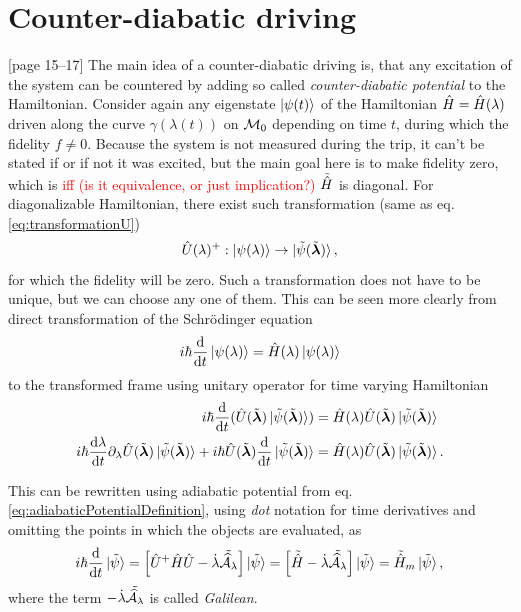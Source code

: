 \section{Counter-diabatic driving}
\citep{kolodrubez}[page 15--17] The main idea of a counter-diabatic driving is, that any excitation of the system can be countered by adding so called \emph{counter-diabatic potential} to the Hamiltonian. Consider again any eigenstate $\kpsit$ of the Hamiltonian $\HH=\HH(\lambda)$ driven along the curve $\gamma(\lambda(t))$ on $\M_0$ depending on time $t$, during which the fidelity $f\neq 0$. Because the system is not measured during the trip, it can't be stated if or if not it was excited, but the main goal here is to make fidelity zero, which is \textcolor{red}{iff (is it equivalence, or just implication?)} $\tilde\HH$ is diagonal. For diagonalizable Hamiltonian, there exist such transformation (same as eq. \ref{eq:transformationU})
\begin{equation}
    \U(\lambda)^+:  \ket{\psi(\lambda)} \rightarrow \ket{\tilde\psi(\tilde\llambda)},
    \label{eq:transformationUtimeDependentH}
\end{equation}
for which the fidelity will be zero. Such a transformation does not have to be unique, but we can choose any one of them. This can be seen more clearly from direct transformation of the Schrödinger equation
\begin{equation}
    i\hbar \der{}{t}\ket{\psi(\lambda)} = \HH(\lambda)\ket{\psi(\lambda)}
\end{equation}
to the transformed frame using unitary operator for time varying Hamiltonian
\begin{align}
    i\hbar \der{}{t}(\U(\tilde\llambda)\ket{\tilde \psi(\tilde\llambda)}) &= \HH(\lambda)\U(\tilde\llambda)\ket{\tilde \psi(\tilde\llambda)} \\
    i\hbar \der{\lambda}{t}\partial_\lambda\U(\tilde\llambda)\ket{\tilde \psi(\tilde\llambda)} + i\hbar \U(\tilde\llambda)\der{}{t}\ket{\tilde \psi(\tilde\llambda)} &= \HH(\lambda)\U(\tilde\llambda)\ket{\tilde \psi(\tilde\llambda)}.
\end{align}

This can be rewritten using adiabatic potential from eq. \ref{eq:adiabaticPotentialDefinition}, using \emph{dot} notation for time derivatives and omitting the points in which the objects are evaluated, as
\begin{equation}
    i\hbar \der{}{t}\ket{\tilde\psi} = \left[\U^+\HH\U-\dot{\lambda}\tilde{\AA_\lambda}\right]\ket{\tilde\psi} = \left[\tilde \HH-\dot{\lambda}\tilde{\AA_\lambda}\right]\ket{\tilde{\psi}} = \tilde{\HH}_m \ket{\tilde{\psi}},
\end{equation}
where the term $-\dot{\lambda}\tilde{\AA_\lambda}$ is called \emph{Galilean}.

